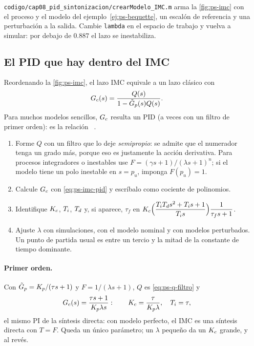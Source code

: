 
\begin{modelo}
\texttt{codigo/cap08\_pid\_sintonizacion/crearModelo\_IMC.m} arma la \cref{fig:ps-imc} con el proceso y el modelo del ejemplo~\ref{ej:ps-bequette}, un escalón de referencia y una perturbación a la salida. Cambie \texttt{lambda} en el espacio de trabajo y vuelva a simular: por debajo de $0.887$ el lazo se inestabiliza.
\end{modelo}

\subsection{El PID que hay dentro del IMC}

Reordenando la \cref{fig:ps-imc}, el lazo IMC equivale a un lazo clásico con
\begin{equation}
  G_c(s)=\frac{Q(s)}{1-\tilde G_p(s)Q(s)} .
  \label{eq:ps-imc-pid}
\end{equation}
Para muchos modelos sencillos, $G_c$ resulta un PID (a veces con un filtro de primer orden): es la relación ~\citep{RMS86}.

\begin{receta}
\begin{enumerate}
  \item Forme $Q$ con un filtro que lo deje \emph{semipropio}: se admite que el numerador tenga un grado más, porque eso es justamente la acción derivativa. Para procesos integradores o inestables use $F=(\gamma s+1)/(\lambda s+1)^n$; si el modelo tiene un polo inestable en $s=p_u$, imponga $F(p_u)=1$.
  \item Calcule $G_c$ con \eqref{eq:ps-imc-pid} y escríbalo como cociente de polinomios.
  \item Identifique $K_c$, $T_i$, $T_d$ y, si aparece, $\tau_f$ en $K_c\Bigl(\dfrac{T_iT_d s^2+T_i s+1}{T_i s}\Bigr)\dfrac{1}{\tau_f s+1}$.
  \item Ajuste $\lambda$ con simulaciones, con el modelo nominal y con modelos perturbados. Un punto de partida usual es entre un tercio y la mitad de la constante de tiempo dominante.
\end{enumerate}
\end{receta}

\paragraph{Primer orden.} Con $\tilde G_p=K_p/(\tau s+1)$ y $F=1/(\lambda s+1)$, $Q$ es \eqref{eq:ps-q-filtro} y
\[
  G_c(s)=\frac{\tau s+1}{K_p\lambda s}:\qquad K_c=\frac{\tau}{K_p\lambda},\quad T_i=\tau ,
\]
el mismo PI de la síntesis directa: con modelo perfecto, el IMC es una síntesis directa con $T=F$. Queda un único parámetro; un $\lambda$ pequeño da un $K_c$ grande, y al revés.

